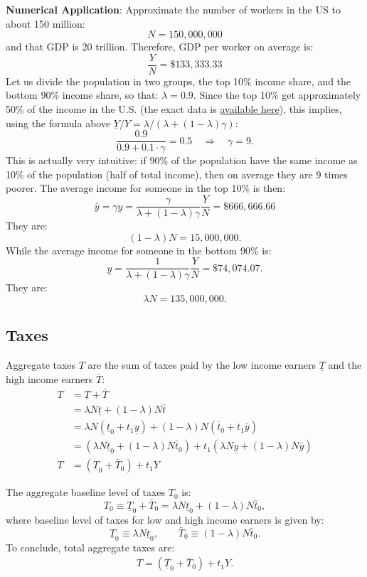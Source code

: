 \documentclass[]{book}
\theoremstyle{definition}
\theoremstyle{definition}
\theoremstyle{definition}
\theoremstyle{remark}
\begin{document}
\textbf{Numerical Application}: Approximate the number of workers in the
US to about 150 million: \[N = 150,000,000\] and that GDP is 20
trillion. Therefore, GDP per worker on average is:
\[\frac{Y}{N}=\$133,333.33\] Let us divide the population in two groups,
the top 10\% income share, and the bottom 90\% income share, so that:
\(\lambda = 0.9\). Since the top 10\% get approximately 50\% of the
income in the U.S. (the exact data is
\href{https://wid.world/world/\#sptinc_p90p100_z/US;FR;DE;CN;ZA;GB;WO/last/eu/k/p/yearly/s/false/25.253500000000003/80/curve/false/country}{available
here}), this implies, using the formula above
\(\underline{Y}/Y=\lambda/\left(\lambda +(1-\lambda)\gamma\right)\):
\[\frac{0.9}{0.9+0.1\cdot \gamma}=0.5 \quad \Rightarrow \quad \gamma = 9.\]
This is actually very intuitive: if 90\% of the population have the same
income as 10\% of the population (half of total income), then on average
they are 9 times poorer. The average income for someone in the top 10\%
is then:
\[\bar{y}=\gamma\underline{y}=\frac{\gamma}{\lambda+(1-\lambda)\gamma}\frac{Y}{N}=\$666,666.66\]
They are: \[(1-\lambda) N = 15,000,000.\] While the average income for
someone in the bottom 90\% is:
\[\underline{y}=\frac{1}{\lambda+(1-\lambda)\gamma}\frac{Y}{N}=\$74,074.07.\]
They are: \[\lambda N = 135,000,000.\]

\subsection{Taxes}\label{taxes}

Aggregate taxes \(T\) are the sum of taxes paid by the low income
earners \(\underline{T}\) and the high income earners \(\bar{T}\): \[
\begin{aligned}
T&=\underline{T} + \bar{T}\\
&=\lambda N \underline{t} + (1-\lambda) N \bar{t} \\
&=\lambda N \left(\underline{t}_{0}+t_1\underline{y}\right) + (1-\lambda) N \left(\bar{t}_{0}+t_1\bar{y}\right)\\
&=\left(\lambda N \underline{t}_{0} + (1-\lambda) N \bar{t}_{0}\right) + t_1\left(\lambda N \underline{y} + (1-\lambda)N\bar{y} \right)\\
T&=\left(\underline{T}_{0} + \bar{T}_{0}\right) + t_1 Y
\end{aligned}
\]

The aggregate baseline level of taxes \(T_0\) is:
\[T_{0} \equiv \underline{T}_0 +  \bar{T}_0 = \lambda  N \underline{t}_0 + (1-\lambda) N \bar{t}_0,\]
where baseline level of taxes for low and high income earners is given
by:
\[\underline{T}_0\equiv\lambda  N \underline{t}_0, \qquad \bar{T}_0\equiv(1-\lambda) N \bar{t}_0.\]
To conclude, total aggregate taxes are: \[
\begin{aligned}
\boxed{T=\left(\underline{T}_{0}+\bar{T}_{0}\right)+t_1 Y}.
\end{aligned}
\]
\end{document}
